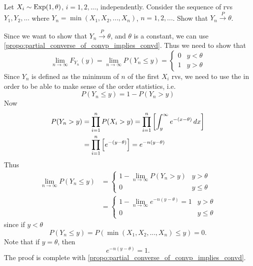 \documentclass[notoc,notitlepage]{tufte-book}
\newcommand{\convp}{\overset{P}{\to}}
\begin{document}
\begin{eg}
  Let $X_i \sim \operatorname{Exp}(1, \theta)$, $i = 1, 2, ...$, independently. Consider the sequence of rvs $Y_1, Y_2, ...$ where $Y_n = \min(X_1, X_2, ..., X_n)$, $n = 1, 2, ...$. Show that $Y_n \convp \theta$.
\end{eg}

\begin{solution}
  Since we want to show that $Y_n \convp \theta$, and $\theta$ is a constant, we can use \cref{propo:partial_converse_of_convp_implies_convd}.
  Thus we need to show that
  \begin{equation*}
    \lim_{n \to \infty} F_{Y_n} (y) = \lim_{n \to \infty} P ( Y_n \leq y ) = \begin{cases}
      0 & y < \theta \\
      1 & y > \theta
    \end{cases}
  \end{equation*}
  Since $Y_n$ is defined as the minimum of $n$ of the first $X_i$ rvs, we need to use the  in order to be able to make sense of the order statistics, i.e.
  \begin{equation*}
    P( Y_n \leq y ) = 1 - P( Y_n > y )
  \end{equation*}
  Now
  \begin{align*}
    P( Y_n > y ) &= \prod_{i=1}^{n} P(X_i > y) = \prod_{i=1}^{n} \left[ \int_{y}^{\infty} e^{- ( x - \theta )} \mathop{}\!d{x} \right] \\
                 &= \prod_{i=1}^{n} \left[ e^{- (y - \theta)} \right] = e^{ -n (y - \theta) }
  \end{align*}
  Thus
  \begin{align*}
    \lim_{n \to \infty} P (Y_n \leq y) &= \begin{cases}
      1 - \lim\limits_{n \to \infty} P( Y_n > y ) & y > \theta \\
      0 & y \leq \theta
    \end{cases} \\
    &= \begin{cases}
       1 - \lim\limits_{n \to \infty} e^{-n (y - \theta)} = 1 & y > \theta \\
       0 & y \leq \theta
    \end{cases}
  \end{align*}
  since if $y < \theta$
  \begin{equation*}
    P( Y_n \leq y ) = P( \min( X_1, X_2, ..., X_n ) \leq y ) = 0.
  \end{equation*}
  Note that if $y = \theta$, then
  \begin{equation*}
    e^{-n ( y - \theta )} = 1.
  \end{equation*}
  The proof is complete with \cref{propo:partial_converse_of_convp_implies_convd}.
\end{solution}
\end{document}
